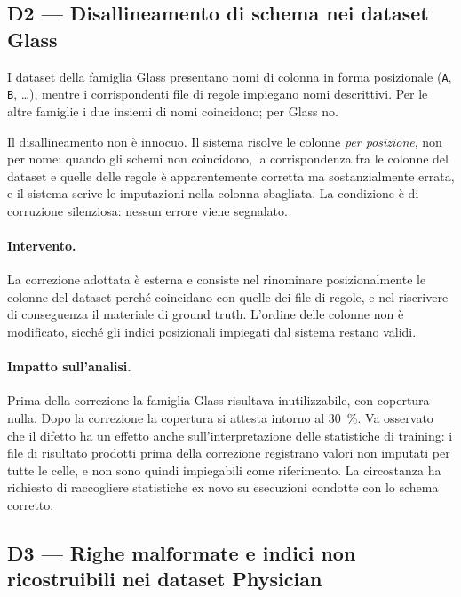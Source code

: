 \subsection{D2 --- Disallineamento di schema nei dataset Glass}\label{sec:d2}

I dataset della famiglia Glass presentano nomi di colonna in forma posizionale
(\texttt{A}, \texttt{B}, \dots), mentre i corrispondenti file di regole impiegano nomi
descrittivi. Per le altre famiglie i due insiemi di nomi coincidono; per Glass no.

Il disallineamento non è innocuo. Il sistema risolve le colonne \emph{per posizione}, non per
nome: quando gli schemi non coincidono, la corrispondenza fra le colonne del dataset e quelle
delle regole è apparentemente corretta ma sostanzialmente errata, e il sistema scrive le
imputazioni nella colonna sbagliata. La condizione è di corruzione silenziosa: nessun errore
viene segnalato.

\paragraph{Intervento.} La correzione adottata è esterna e consiste nel rinominare
posizionalmente le colonne del dataset perché coincidano con quelle dei file di regole, e nel
riscrivere di conseguenza il materiale di ground truth. L'ordine delle colonne non è modificato,
sicché gli indici posizionali impiegati dal sistema restano validi.

\paragraph{Impatto sull'analisi.} Prima della correzione la famiglia Glass risultava
inutilizzabile, con copertura nulla. Dopo la correzione la copertura si attesta intorno al
\SI{30}{\percent}. Va osservato che il difetto ha un effetto anche sull'interpretazione delle
statistiche di training: i file di risultato prodotti prima della correzione registrano valori
non imputati per tutte le celle, e non sono quindi impiegabili come riferimento. La circostanza ha
richiesto di raccogliere statistiche ex novo su esecuzioni condotte con lo schema corretto.

\subsection{D3 --- Righe malformate e indici non ricostruibili nei dataset Physician}
\label{sec:d3}

